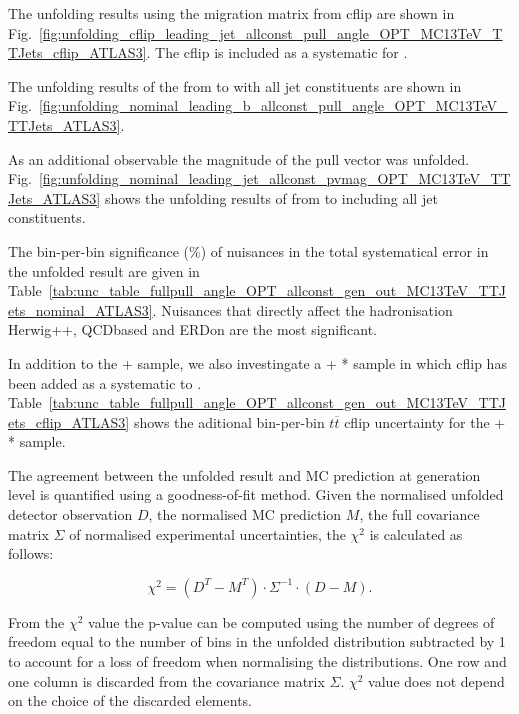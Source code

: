 The unfolding results using the migration matrix from \ttbar cflip are shown in Fig.~\ref{fig:unfolding_cflip_leading_jet_allconst_pull_angle_OPT_MC13TeV_TTJets_cflip_ATLAS3}. The \ttbar cflip is included as a systematic for \ttbar.

The unfolding results of the \pullangle from \leadingb to \scndleadingb with all jet constituents are shown in Fig.~\ref{fig:unfolding_nominal_leading_b_allconst_pull_angle_OPT_MC13TeV_TTJets_ATLAS3}.

As an additional observable the magnitude of the pull vector \pvmag was unfolded. Fig.~\ref{fig:unfolding_nominal_leading_jet_allconst_pvmag_OPT_MC13TeV_TTJets_ATLAS3} shows the unfolding results of \pvmag from \leadingjet to \scndleadingjet including all jet constituents.

The bin-per-bin significance (\%) of nuisances in the total systematical error in the unfolded result are given in Table~\ref{tab:unc_table_fullpull_angle_OPT_allconst_gen_out_MC13TeV_TTJets_nominal_ATLAS3}. Nuisances that directly affect the hadronisation \ttbar Herwig++, \ttbar QCDbased and \ttbar ERDon are the most significant.

In addition to the \POWHEG+ sample, we also investingate a \POWHEG+ * sample in which \ttbar cflip has been added as a systematic to \ttbar. Table~\ref{tab:unc_table_fullpull_angle_OPT_allconst_gen_out_MC13TeV_TTJets_cflip_ATLAS3} shows the aditional bin-per-bin $t\overline{t}$ cflip uncertainty for the \POWHEG+ * sample.

The agreement between the unfolded result and MC prediction at generation level is quantified using a goodness-of-fit method. Given the normalised unfolded detector observation $D$, the normalised MC prediction $M$, the full covariance matrix $\Sigma$ of normalised experimental uncertainties, the $\chi^{2}$ is calculated as follows:

\begin{equation}
  \chi^{2}=(D^{T}-M^{T})\cdot\Sigma^{-1}\cdot(D-M).
  \label{eq:chi2}
\end{equation}

From the $\chi^{2}$ value the p-value can be computed using the number of degrees of freedom equal to the number of bins in the unfolded distribution subtracted by 1 to account for a loss of freedom when normalising the distributions. One row and one column is discarded from the covariance matrix $\Sigma$. $\chi^{2}$ value does not depend on the choice of the discarded elements.

